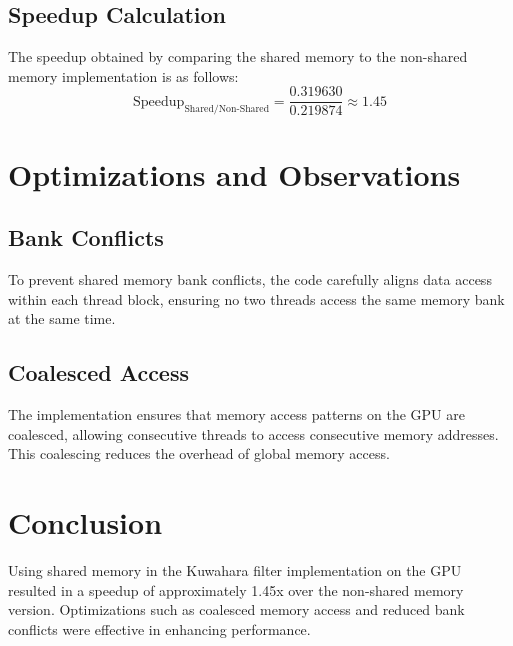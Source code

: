 \documentclass{article}
\begin{document}
\subsection{Speedup Calculation}
The speedup obtained by comparing the shared memory to the non-shared memory implementation is as follows:
\[
\text{Speedup}_{\text{Shared/Non-Shared}} = \frac{0.319630}{0.219874} \approx 1.45
\]

\section{Optimizations and Observations}

\subsection{Bank Conflicts}
To prevent shared memory bank conflicts, the code carefully aligns data access within each thread block, ensuring no two threads access the same memory bank at the same time.

\subsection{Coalesced Access}
The implementation ensures that memory access patterns on the GPU are coalesced, allowing consecutive threads to access consecutive memory addresses. This coalescing reduces the overhead of global memory access.

\section{Conclusion}
Using shared memory in the Kuwahara filter implementation on the GPU resulted in a speedup of approximately 1.45x over the non-shared memory version. Optimizations such as coalesced memory access and reduced bank conflicts were effective in enhancing performance.
\end{document}
